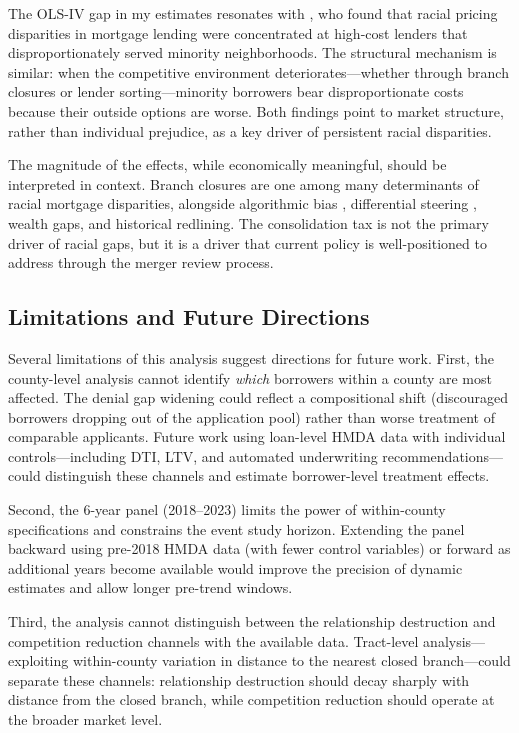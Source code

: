 \documentclass[12pt]{article}
\begin{document}
The OLS-IV gap in my estimates resonates with \citet{bayer2018}, who found that racial pricing disparities in mortgage lending were concentrated at high-cost lenders that disproportionately served minority neighborhoods. The structural mechanism is similar: when the competitive environment deteriorates---whether through branch closures or lender sorting---minority borrowers bear disproportionate costs because their outside options are worse. Both findings point to market structure, rather than individual prejudice, as a key driver of persistent racial disparities.

The magnitude of the effects, while economically meaningful, should be interpreted in context. Branch closures are one among many determinants of racial mortgage disparities, alongside algorithmic bias \citep{bartlett2022}, differential steering \citep{bayer2018}, wealth gaps, and historical redlining. The consolidation tax is not the primary driver of racial gaps, but it is a driver that current policy is well-positioned to address through the merger review process.

\subsection{Limitations and Future Directions}

Several limitations of this analysis suggest directions for future work. First, the county-level analysis cannot identify \emph{which} borrowers within a county are most affected. The denial gap widening could reflect a compositional shift (discouraged borrowers dropping out of the application pool) rather than worse treatment of comparable applicants. Future work using loan-level HMDA data with individual controls---including DTI, LTV, and automated underwriting recommendations---could distinguish these channels and estimate borrower-level treatment effects.

Second, the 6-year panel (2018--2023) limits the power of within-county specifications and constrains the event study horizon. Extending the panel backward using pre-2018 HMDA data (with fewer control variables) or forward as additional years become available would improve the precision of dynamic estimates and allow longer pre-trend windows.

Third, the analysis cannot distinguish between the relationship destruction and competition reduction channels with the available data. Tract-level analysis---exploiting within-county variation in distance to the nearest closed branch---could separate these channels: relationship destruction should decay sharply with distance from the closed branch, while competition reduction should operate at the broader market level.
\end{document}
